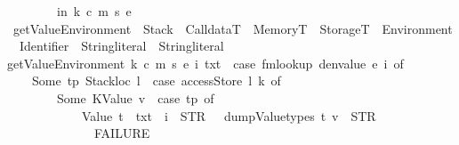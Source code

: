 \begin{isabellebody}
\ \ \ \ \ \ \ \ in\ {\isacharparenleft}{\kern0pt}k{\isacharcomma}{\kern0pt}\ c{\isacharcomma}{\kern0pt}\ m{\isacharcomma}{\kern0pt}\ s{\isacharprime}{\kern0pt}{\isacharcomma}{\kern0pt}\ e{\isacharprime}{\kern0pt}{\isacharparenright}{\kern0pt}\isanewline
{\isacharparenright}{\kern0pt}{\isachardoublequoteclose}\isanewline
\isanewline
{}\isamarkupfalse%
\ getValue\isactrlsub E\isactrlsub n\isactrlsub v\isactrlsub i\isactrlsub r\isactrlsub o\isactrlsub n\isactrlsub m\isactrlsub e\isactrlsub n\isactrlsub t\ {\isacharcolon}{\kern0pt}{\isacharcolon}{\kern0pt}\ {\isachardoublequoteopen}Stack\ {\isasymRightarrow}\ CalldataT\ {\isasymRightarrow}\ MemoryT\ {\isasymRightarrow}\ StorageT\ {\isasymRightarrow}\ Environment\ {\isasymRightarrow}\ Identifier\ {\isasymRightarrow}\ String{\isachardot}{\kern0pt}literal\ {\isasymRightarrow}\ String{\isachardot}{\kern0pt}literal{\isachardoublequoteclose}\isanewline
\ \ \ \isanewline
{\isachardoublequoteopen}getValue\isactrlsub E\isactrlsub n\isactrlsub v\isactrlsub i\isactrlsub r\isactrlsub o\isactrlsub n\isactrlsub m\isactrlsub e\isactrlsub n\isactrlsub t\ k\ c\ m\ s\ e\ i\ txt\ {\isacharequal}{\kern0pt}\ {\isacharparenleft}{\kern0pt}case\ fmlookup\ {\isacharparenleft}{\kern0pt}denvalue\ e{\isacharparenright}{\kern0pt}\ i\ of\isanewline
\ \ \ \ Some\ {\isacharparenleft}{\kern0pt}tp{\isacharcomma}{\kern0pt}\ Stackloc\ l{\isacharparenright}{\kern0pt}\ {\isasymRightarrow}\ {\isacharparenleft}{\kern0pt}case\ accessStore\ l\ k\ of\isanewline
\ \ \ \ \ \ \ \ Some\ {\isacharparenleft}{\kern0pt}KValue\ v{\isacharparenright}{\kern0pt}\ {\isasymRightarrow}\ {\isacharparenleft}{\kern0pt}case\ tp\ of\isanewline
\ \ \ \ \ \ \ \ \ \ \ \ Value\ t\ {\isasymRightarrow}\ {\isacharparenleft}{\kern0pt}txt\ {\isacharplus}{\kern0pt}\ i\ {\isacharplus}{\kern0pt}\ {\isacharparenleft}{\kern0pt}STR\ {\isacharprime}{\kern0pt}{\isacharprime}{\kern0pt}{\isacharequal}{\kern0pt}{\isacharequal}{\kern0pt}{\isacharprime}{\kern0pt}{\isacharprime}{\kern0pt}{\isacharparenright}{\kern0pt}\ {\isacharplus}{\kern0pt}\ dump\isactrlsub V\isactrlsub a\isactrlsub l\isactrlsub u\isactrlsub e\isactrlsub t\isactrlsub y\isactrlsub p\isactrlsub e\isactrlsub s\ t\ v\ {\isacharplus}{\kern0pt}\ {\isacharparenleft}{\kern0pt}STR\ {\isacharprime}{\kern0pt}{\isacharprime}{\kern0pt}{\isasymnewline}{\isacharprime}{\kern0pt}{\isacharprime}{\kern0pt}{\isacharparenright}{\kern0pt}{\isacharparenright}{\kern0pt}\isanewline
\ \ \ \ \ \ \ \ \ \ {\isacharbar}{\kern0pt}\ \ {\isacharunderscore}{\kern0pt}\ {\isasymRightarrow}\ FAILURE{\isacharparenright}{\kern0pt}\isanewline

\end{isabellebody}
